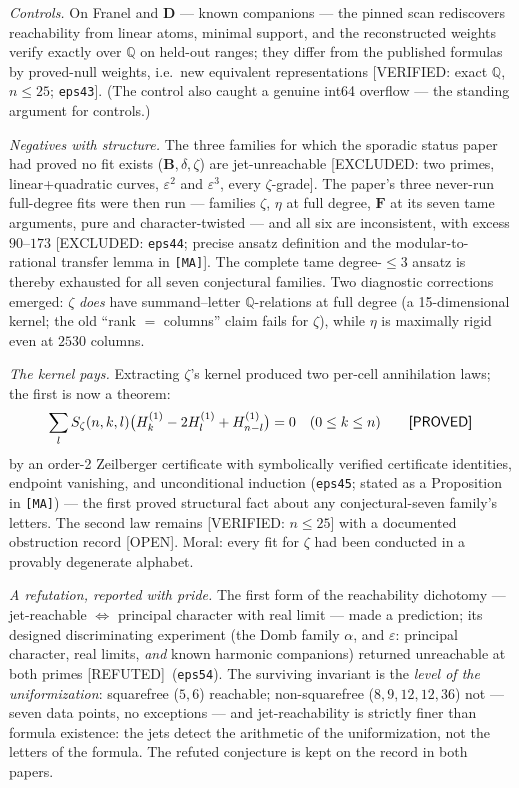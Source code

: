 \documentclass[11pt,reqno]{amsart}
\theoremstyle{plain}
\theoremstyle{definition}
\theoremstyle{remark}
\newcommand{\Q}{\mathbb{Q}}
\newcommand{\HH}[2]{H^{(#1)}_{#2}}
\newcommand{\Proved}{\textup{\textsf{[PROVED]}}}
\newcommand{\VerifiedR}[1]{\textup{\textsf{[VERIFIED: #1]}}}
\newcommand{\ExcludedR}[1]{\textup{\textsf{[EXCLUDED: #1]}}}
\newcommand{\Open}{\textup{\textsf{[OPEN]}}}
\newcommand{\Refuted}{\textup{\textsf{[REFUTED]}}}
\newcommand{\MA}{\texttt{[MA]}}
\begin{document}
\emph{Controls.} On Franel and $\mathbf D$ --- known companions --- the
pinned scan rediscovers reachability from linear atoms, minimal support,
and the reconstructed weights verify exactly over $\Q$ on held-out ranges;
they differ from the published formulas by proved-null weights, i.e.\ new
equivalent representations \VerifiedR{exact $\Q$, $n\le25$;
\texttt{eps43}}. (The control also caught a genuine int64 overflow ---
the standing argument for controls.)

\emph{Negatives with structure.} The three families for which the
sporadic status paper had proved no fit exists ($\mathbf B,\delta,\zeta$)
are jet-unreachable \ExcludedR{two primes, linear+quadratic curves,
$\varepsilon^2$ and $\varepsilon^3$, every $\zeta$-grade}. The paper's
three never-run full-degree fits were then run --- families $\zeta$,
$\eta$ at full degree, $\mathbf F$ at its seven tame arguments, pure and
character-twisted --- and all six are inconsistent, with excess
$90$--$173$ \ExcludedR{\texttt{eps44}; precise ansatz definition and the
modular-to-rational transfer lemma in \MA}. The complete tame
degree-$\le3$ ansatz is thereby exhausted for all seven conjectural
families. Two diagnostic corrections emerged: $\zeta$ \emph{does} have
summand--letter $\Q$-relations at full degree (a 15-dimensional kernel;
the old ``rank $=$ columns'' claim fails for $\zeta$), while $\eta$ is
maximally rigid even at $2530$ columns.

\emph{The kernel pays.} Extracting $\zeta$'s kernel produced two per-cell
annihilation laws; the first is now a theorem:
\begin{equation}\label{eq:ann}
\sum_lS_\zeta(n,k,l)\bigl(\HH1k-2\HH1l+\HH1{n-l}\bigr)=0
\quad(0\le k\le n)
\qquad\Proved
\end{equation}
by an order-2 Zeilberger certificate with symbolically verified
certificate identities, endpoint vanishing, and unconditional induction
(\texttt{eps45}; stated as a Proposition in \MA) --- the first proved
structural fact about any conjectural-seven family's letters. The second
law remains \VerifiedR{$n\le25$} with a documented obstruction record
\Open. Moral: every fit for $\zeta$ had been conducted in a provably
degenerate alphabet.

\emph{A refutation, reported with pride.} The first form of the
reachability dichotomy --- jet-reachable $\iff$ principal character with
real limit --- made a prediction; its designed discriminating experiment
(the Domb family $\alpha$, and $\varepsilon$: principal character, real
limits, \emph{and} known harmonic companions) returned unreachable at
both primes \Refuted\ (\texttt{eps54}). The surviving invariant is the
\emph{level of the uniformization}: squarefree ($5,6$) reachable;
non-squarefree ($8,9,12,12,36$) not --- seven data points, no exceptions
--- and jet-reachability is strictly finer than formula existence: the
jets detect the arithmetic of the uniformization, not the letters of the
formula. The refuted conjecture is kept on the record in both papers.
\end{document}
